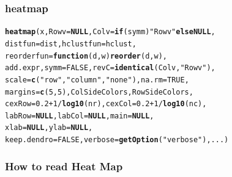 \documentclass[UTF8]{beamer}\usepackage[]{graphicx}\usepackage[]{color}
\makeatletter
\newcommand{\hlnum}[1]{\textcolor[rgb]{0.686,0.059,0.569}{#1}}%
\newcommand{\hlstr}[1]{\textcolor[rgb]{0.192,0.494,0.8}{#1}}%
\newcommand{\hlopt}[1]{\textcolor[rgb]{0,0,0}{#1}}%
\newcommand{\hlstd}[1]{\textcolor[rgb]{0.345,0.345,0.345}{#1}}%
\newcommand{\hlkwa}[1]{\textcolor[rgb]{0.161,0.373,0.58}{\textbf{#1}}}%
\newcommand{\hlkwc}[1]{\textcolor[rgb]{0.333,0.667,0.333}{#1}}%
\newcommand{\hlkwd}[1]{\textcolor[rgb]{0.737,0.353,0.396}{\textbf{#1}}}%
\newenvironment{kframe}{%
 \def\at@end@of@kframe{}%
 \ifinner\ifhmode%
  \def\at@end@of@kframe{\end{minipage}}%
  \begin{minipage}{\columnwidth}%
 \fi\fi%
 \def\FrameCommand##1{\hskip\@totalleftmargin \hskip-\fboxsep
 \colorbox{shadecolor}{##1}\hskip-\fboxsep
     \hskip-\linewidth \hskip-\@totalleftmargin \hskip\columnwidth}%
 \MakeFramed {\advance\hsize-\width
   \@totalleftmargin\z@ \linewidth\hsize
   \@setminipage}}%
 {\par\unskip\endMakeFramed%
 \at@end@of@kframe}
\newenvironment{knitrout}{}{} %
\makeatother
\begin{document}
\begin{frame}[fragile]
  \frametitle{heatmap}
\small
\begin{knitrout}
\color{fgcolor}\begin{kframe}
\begin{alltt}
 \hlkwd{heatmap}\hlstd{(x,} \hlkwc{Rowv} \hlstd{=} \hlkwa{NULL}\hlstd{,} \hlkwc{Colv} \hlstd{=} \hlkwa{if}\hlstd{(symm)}\hlstr{"Rowv"} \hlkwa{else NULL}\hlstd{,}
 \hlkwc{distfun} \hlstd{= dist,} \hlkwc{hclustfun} \hlstd{= hclust,}
 \hlkwc{reorderfun} \hlstd{=} \hlkwa{function}\hlstd{(}\hlkwc{d}\hlstd{,} \hlkwc{w}\hlstd{)} \hlkwd{reorder}\hlstd{(d, w),}
 \hlstd{add.expr,} \hlkwc{symm} \hlstd{=} \hlnum{FALSE}\hlstd{,} \hlkwc{revC} \hlstd{=} \hlkwd{identical}\hlstd{(Colv,} \hlstr{"Rowv"}\hlstd{),}
 \hlkwc{scale} \hlstd{=} \hlkwd{c}\hlstd{(}\hlstr{"row"}\hlstd{,} \hlstr{"column"}\hlstd{,} \hlstr{"none"}\hlstd{),} \hlkwc{na.rm} \hlstd{=} \hlnum{TRUE}\hlstd{,}
 \hlkwc{margins} \hlstd{=} \hlkwd{c}\hlstd{(}\hlnum{5}\hlstd{,} \hlnum{5}\hlstd{), ColSideColors, RowSideColors,}
 \hlkwc{cexRow} \hlstd{=} \hlnum{0.2} \hlopt{+} \hlnum{1}\hlopt{/}\hlkwd{log10}\hlstd{(nr),} \hlkwc{cexCol} \hlstd{=} \hlnum{0.2} \hlopt{+} \hlnum{1}\hlopt{/}\hlkwd{log10}\hlstd{(nc),}
 \hlkwc{labRow} \hlstd{=} \hlkwa{NULL}\hlstd{,} \hlkwc{labCol} \hlstd{=} \hlkwa{NULL}\hlstd{,} \hlkwc{main} \hlstd{=} \hlkwa{NULL}\hlstd{,}
 \hlkwc{xlab} \hlstd{=} \hlkwa{NULL}\hlstd{,} \hlkwc{ylab} \hlstd{=} \hlkwa{NULL}\hlstd{,}
 \hlkwc{keep.dendro} \hlstd{=} \hlnum{FALSE}\hlstd{,} \hlkwc{verbose} \hlstd{=} \hlkwd{getOption}\hlstd{(}\hlstr{"verbose"}\hlstd{), ...)}
\end{alltt}
\end{kframe}
\end{knitrout}
\end{frame}

\begin{frame}[fragile]
  \frametitle{How to read Heat Map}

\begin{knitrout}
\color{fgcolor}\begin{kframe}


{\ttfamily\noindent\bfseries{}}\end{kframe}
\end{knitrout}
\end{frame}
\end{document}
